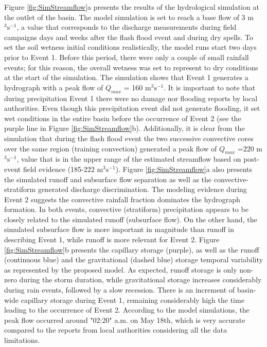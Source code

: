 \documentclass[hess, manuscript]{copernicus}
\begin{document}
Figure \ref{fig:SimStreamflow}a presents the results of the hydrological simulation at the outlet of the basin.  The model simulation is set to reach a base flow of 3 m$^3 \text{s}^{-1}$, a value that corresponds to the discharge measurements during field campaigns days and weeks after the flash flood event and during dry spells.  To set the soil wetness initial conditions realistically, the model runs start two days prior to Event 1. Before this period, there were only a couple of small rainfall events; for this reason, the overall wetness was set to represent to dry conditions at the start of the simulation. The simulation shows that Event 1 generates a hydrograph with a peak flow of $Q_{max}$ = 160 m$^3 \text{s}^{-1}$. It is important to note that during precipitation Event 1 there were no damage nor flooding reports by local authorities. Even though this precipitation event did not generate  flooding, it set wet conditions in the entire basin before the occurrence of Event 2  (see the purple line in Figure \ref{fig:SimStreamflow}b). Additionally,  it is clear from the simulation that during the flash flood event the two successive convective cores over the same region (training convection) generated a peak flow of $Q_{max}$ =220 m$^3 \text{s}^{-1}$, value that is in the upper range of the estimated streamflow based on post-event field evidence (185-222 m$^3 \text{s}^{-1}$). Figure \ref{fig:SimStreamflow}a also presents the simulated runoff and subsurface flow separation as well as the convective-stratiform generated discharge discrimination.  The modeling evidence during Event 2 suggests the convective rainfall fraction dominates the hydrograph formation. In both events, convective (stratiform) precipitation appears to be closely related to the simulated runoff (subsurface flow).  On the other hand, the simulated subsurface flow is more important in magnitude than runoff in describing Event 1, while runoff is more relevant for Event 2. Figure \ref{fig:SimStreamflow}b presents the capillary storage (purple), as well as the runoff (continuous blue) and the gravitational (dashed blue) storage temporal variability as represented by the proposed model.  As expected, runoff storage is only non-zero during the storm duration, while gravitational storage increases considerably during rain events, followed by a slow recession.  There is an increment of basin-wide capillary storage during Event 1, remaining considerably high the time leading to the occurrence of Event 2. According to the model simulations, the peak flow occurred around "02:20" a.m. on May 18th, which is very accurate compared to the reports from local authorities considering all the data limitations.\\
\end{document}
